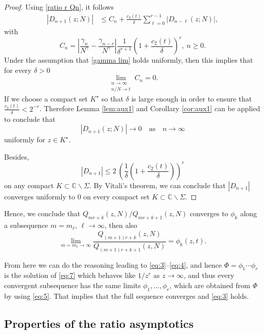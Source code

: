 \documentclass[12pt]{article}
\numberwithin{equation}{section}
\begin{document}
\begin{proof}
Using \eqref{ratio r Qn}, it follows 
\begin{align}\label{Dn ineq}
	\left| D_{n+1}(z;N) \right| 
		& \leq
		C_n+  \frac{c_2(t)}{\delta} \sum_{\ell = 0} ^{r-1}  \left| D_{n-\ell} (z;N) \right| , 
\end{align}
with 
\begin{equation*}
	C_{n} =\left|  \frac{\gamma_{n}}{N^\gamma} - \frac{\gamma_{n-r}}{N^\gamma}  \right| 
				\frac{1}{\delta^{r+1}}  \left( 1 + \frac{c_2(t)}{\delta}\right)^r, \ n\geq 0. 
\end{equation*}
Under the assumption that \eqref{gamma lim} holds uniformly, then this implies that for every $\delta>0$
\[
	\lim_{\substack{n\to\infty\\ n/N\to t}} C_n =0. 
\]
If we choose a compact set $K^\star$ so that $\delta$ is large enough in order to ensure that $ \frac{c_2(t)}{\delta} < 2^{-r} $. Therefore Lemma \ref{lem:aux1} and Corollary \ref{cor:aux1} can be applied to conclude that 
\[ 
|D_{n+1}(z;N)|\to 0 \quad \text{as}\quad n\to \infty
\] 
uniformly for $z\in K^\star$. 

Besides, 
\[
	|D_{n+1} | %
		\leq 2 \ \left(\frac{1}{\delta} \left( 1 + \frac{c_2(t)}{\delta}\right)\right)^{r}
\]
on any compact $K\subset \mathbb{C}\backslash \Sigma$. By Vitali's theorem, we can conclude that $|D_{n+1}|$ converges uniformly to $0$ on every compact set $K\subset \mathbb{C}\backslash \Sigma$. 
\end{proof}


Hence, we conclude that $Q_{mr+k}(z,N)/Q_{mr+k+1}(z,N)$ converges to $\phi_k$ along a subsequence $m=m_\ell$, $\ell \to \infty$,
then also
\[  \lim_{m=m_\ell \to \infty} \frac{Q_{(m+1)r+k}(z,N)}{Q_{(m+1)r+k+1}(z,N)} = \phi_k(z,t).  \]


From here we can do the reasoning leading to \eqref{eq:3}--\eqref{eq:4}, and hence $\Phi=\phi_1\cdots\phi_r$
is the solution of \eqref{eq:7} which behaves like $1/z^r$ as $z \to \infty$, and thus every convergent subsequence has the same limits $\phi_1,\ldots,\phi_r$, which are obtained from $\Phi$ by using \eqref{eq:5}. That implies that the full sequence converges and \eqref{eq:3} holds.


 
\subsection{Properties of the ratio asymptotics}\label{Subsec: Phi} 
\end{document}
